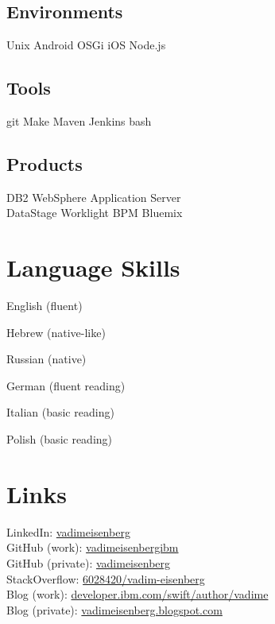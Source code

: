 \documentclass[]{deedy-resume}
\begin{document}
\begin{minipage}[t]{0.33\textwidth}
\subsection{Environments}
Unix \textbullet{}  Android \textbullet{}  OSGi \textbullet{} iOS \textbullet{} Node.js
\sectionsep

\subsection{Tools}
git \textbullet{}  Make \textbullet{} Maven \textbullet{}  Jenkins  \textbullet{} bash
\sectionsep

\subsection{Products}
DB2 \textbullet{}  WebSphere Application Server\\
DataStage \textbullet{}  Worklight  \textbullet{} BPM   \textbullet{} Bluemix
\sectionsep

\section{Language Skills}
\vspace{\topsep} %
\begin{tightemize}
\item English (fluent)
\item Hebrew (native-like)
\item Russian (native)
\item German (fluent reading)
\item Italian (basic reading)
\item Polish (basic reading)
\end{tightemize}
\sectionsep

\section{Links}
LinkedIn:  \href{https://www.linkedin.com/in/vadimeisenberg}{vadimeisenberg} \\
GitHub (work): \href{https://github.com/vadimeisenbergibm}{vadimeisenbergibm} \\
GitHub (private): \href{https://github.com/vadimeisenberg}{vadimeisenberg} \\
StackOverflow: \href{http://stackoverflow.com/users/6028420/vadim-eisenberg}{6028420/vadim-eisenberg} \\
Blog (work): \href{https://developer.ibm.com/swift/author/vadime/}{developer.ibm.com/swift/author/vadime} \\
Blog (private):  \href{http://vadimeisenberg.blogspot.com}{vadimeisenberg.blogspot.com}
\sectionsep

%
%

\end{minipage}
\end{document}
